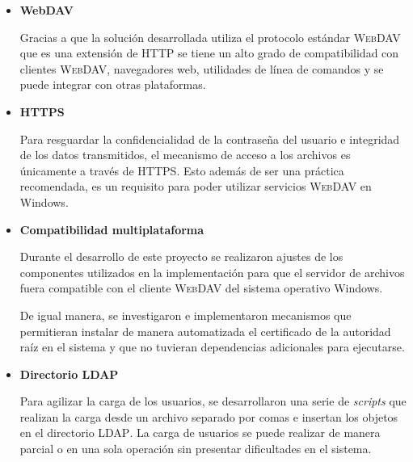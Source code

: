 \begin{itemize}
  \item \textbf{WebDAV}

Gracias a que la soluci\'{o}n desarrollada utiliza el protocolo est\'{a}ndar \textsc{WebDAV} que es una extensi\'{o}n de \textsc{HTTP} se tiene un alto grado de compatibilidad con clientes \textsc{WebDAV}, navegadores web, utilidades de l\'{i}nea de comandos y se puede integrar con otras plataformas.

  \item \textbf{HTTPS}

Para resguardar la confidencialidad de la contrase\~{n}a del usuario e integridad de los datos transmitidos, el mecanismo de acceso a los archivos es \'{u}nicamente a trav\'{e}s de \textsc{HTTPS}. Esto adem\'{a}s de ser una pr\'{a}ctica recomendada, es un requisito para poder utilizar servicios \textsc{WebDAV} en Windows.

  \item \textbf{Compatibilidad multiplataforma}

Durante el desarrollo de este proyecto se realizaron ajustes de los componentes utilizados en la implementaci\'{o}n para que el servidor de archivos fuera compatible con el cliente \textsc{WebDAV} del sistema operativo Windows.

De igual manera, se investigaron e implementaron mecanismos que permitieran instalar de manera automatizada el certificado de la autoridad ra\'{i}z en el sistema y que no tuvieran dependencias adicionales para ejecutarse.

  \item \textbf{Directorio LDAP}


Para agilizar la carga de los usuarios, se desarrollaron una serie de \textit{scripts} que realizan la carga desde un archivo separado por comas e insertan los objetos en el directorio \textsc{LDAP}. La carga de usuarios se puede realizar de manera parcial o en una sola operaci\'{o}n sin presentar dificultades en el sistema.


\end{itemize}

